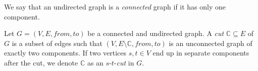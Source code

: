 \begin{definition}
    We say that an undirected graph is a \emph{connected} graph if it has only one component.
\end{definition}

\begin{definition}[Cut]
    Let $G = (V, E, from, to)$ be a connected and undirected graph. A \emph{cut} $\mathbb{C} \subseteq E$ of $G$ is a subset of edges such that $(V, E \setminus \mathbb{C}, from, to)$ is an unconnected graph of exactly two components. If two vertices $s,t \in V$ end up in separate components after the cut, we denote $\mathbb{C}$ as an $s$-$t$-\emph{cut} in $G$.
\end{definition}
